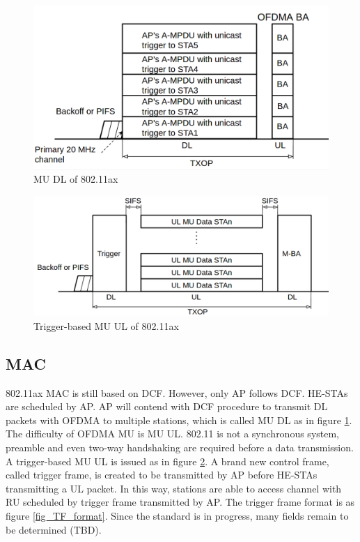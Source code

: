 \begin{figure}[!t]
\includegraphics[scale=0.4]{./figure/chp2/fig_MU_DL.png}
\caption{MU DL of 802.11ax}
\label{fig_MU_DL}
\end{figure}


\begin{figure}[!t]
\includegraphics[scale=0.36]{./figure/chp2/fig_MU_UL.png}
\caption{Trigger-based MU UL of 802.11ax}
\label{fig_MU_UL}
\end{figure}


\subsection{MAC}
802.11ax MAC is still based on DCF. However, only AP follows DCF. HE-STAs are scheduled by AP.
AP will contend with DCF procedure to transmit DL packets with OFDMA to multiple stations, which is called MU DL as in figure \ref{fig_MU_DL}. 
The difficulty of OFDMA MU is MU UL. 
802.11 is not a synchronous system, preamble and even two-way handshaking are required before a data transmission. 
A trigger-based MU UL is issued as in figure \ref{fig_MU_UL}.
A brand new control frame, called trigger frame, is created to be transmitted by AP before HE-STAs transmitting a UL packet. 
In this way, stations are able to access channel with RU scheduled by trigger frame transmitted by AP. 
The trigger frame format is as figure \ref{fig_TF_format}. Since the standard is in progress, many fields remain to be determined (TBD). 

